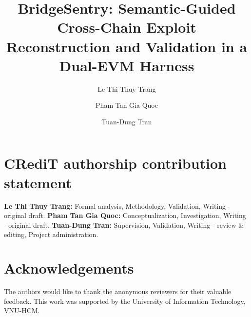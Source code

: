 \documentclass[a4paper]{cas-sc}
\begin{document}
\title[mode=title]{BridgeSentry: Semantic-Guided Cross-Chain Exploit Reconstruction and Validation in a Dual-EVM Harness}
\author[1,2]{Le Thi Thuy Trang}
\author[1,2]{Pham Tan Gia Quoc}
\author[1,2]{Tuan-Dung Tran}
\cormark[1]


\maketitle

\section*{CRediT authorship contribution statement}
\textbf{Le Thi Thuy Trang:} Formal analysis, Methodology, Validation, Writing - original draft. \textbf{Pham Tan Gia Quoc:} Conceptualization, Investigation, Writing - original draft. \textbf{Tuan-Dung Tran:} Supervision, Validation, Writing - review \& editing, Project administration.

\section*{Acknowledgements}
The authors would like to thank the anonymous reviewers for their valuable feedback. This work was supported by the University of Information Technology, VNU-HCM.
\end{document}
